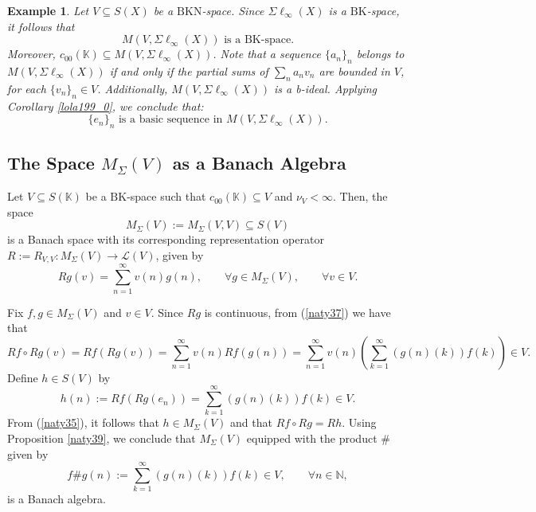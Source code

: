 \documentclass[14pt, a4paper]{article}  %
\newcommand{\K}{\mathbb{K}}
\newcommand{\N}{\mathbb{N}}
\newcommand{\BK}{\text{BK}}
\newcommand{\BKa}{\text{BKN}}
\newtheorem{example}{Example}[section]  %
\begin{document}
\begin{example}\label{lola212} 
	Let $V \subseteq S(X)$ be a $\BKa$-space. Since $\Sigma \ell_{\infty}(X)$ is a $\BK$-space, it follows that 
	\begin{equation}
		\text{$M(V,\Sigma \ell_{\infty}(X))$ is a $\BK$-space.}
	\end{equation}
	Moreover, $c_{00}(\K) \subseteq M(V, \Sigma \ell_{\infty}(X))$. Note that a sequence $\{a_n\}_n$ belongs to $M(V,\Sigma \ell_{\infty}(X))$ if and only if the partial sums of $\sum_n a_n v_n$ are bounded in $V$, for each $\{v_n\}_n \in V$. Additionally, $M(V,\Sigma \ell_{\infty}(X))$ is a b-ideal.    Applying Corollary \ref{lola199_0}, we conclude that:
	\begin{equation}
		\{e_n\}_n \text{ is a basic sequence in } M(V,\Sigma \ell_{\infty}(X)).
	\end{equation}
\end{example}

\subsection{The Space $M_{\Sigma}(V)$ as a Banach Algebra}
Let $V \subseteq S(\K)$ be a $\BK$-space such that $c_{00}(\K) \subseteq V$ and $\nu_{V} < \infty$. Then, the space 
\begin{equation}
	M_{\Sigma}(V) := M_{\Sigma}(V, V) \subseteq S(V)
\end{equation}
is a Banach space with its corresponding representation operator $R := R_{V, V}: M_{\Sigma}(V) \to \mathcal{L}(V)$, given by
\begin{equation}\label{naty37}
	Rg(v) = \sum_{n=1}^{\infty} v(n) g(n), \qquad \forall g \in M_{\Sigma}(V), \qquad \forall v \in V.
\end{equation}

Fix $f, g \in M_{\Sigma}(V)$ and $v \in V$. Since $Rg$ is continuous, from (\ref{naty37}) we have that
\begin{equation}\label{naty35}
	Rf \circ Rg(v) = Rf(Rg(v)) = \sum_{n=1}^{\infty} v(n) Rf(g(n)) = \sum_{n=1}^{\infty} v(n) \left( \sum_{k=1}^{\infty} (g(n)(k)) f(k) \right) \in V.
\end{equation}
Define $h \in S(V)$ by
\begin{equation}
	h(n) := Rf(Rg(e_{n})) = \sum_{k=1}^{\infty} (g(n)(k)) f(k) \in V.
\end{equation}
From (\ref{naty35}), it follows that $h \in M_{\Sigma}(V)$ and that $Rf \circ Rg = Rh$. Using Proposition \ref{naty39}, we conclude that $M_{\Sigma}(V)$ equipped with the product $\#$ given by
\begin{equation}
	f \# g (n) := \sum_{k=1}^{\infty} (g(n)(k)) f(k) \in V, \qquad \forall n \in \N,
\end{equation}
is a Banach algebra.
\end{document}
